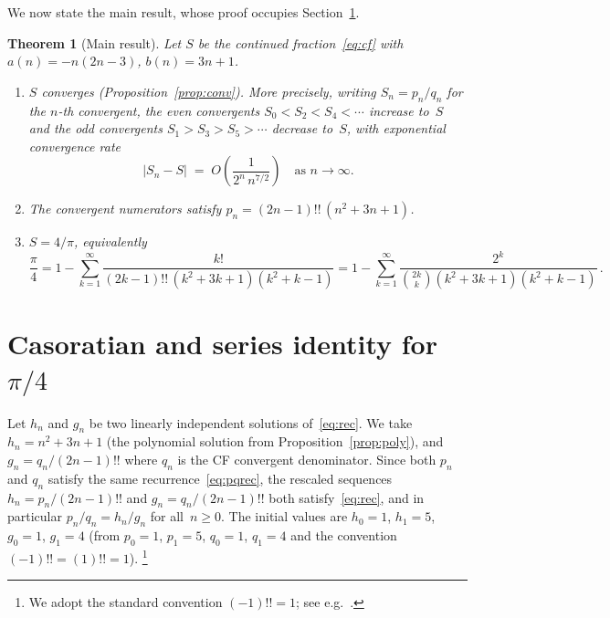 \documentclass[11pt]{article}
\newcommand{\dff}[1]{(#1)!!}
\newtheorem{theorem}{Theorem}[section]
\theoremstyle{remark}
\begin{document}
We now state the main result, whose proof occupies
Section~\ref{sec:casoratian}.

\begin{theorem}[Main result]\label{thm:main}
Let $S$ be the continued fraction~\eqref{eq:cf} with
$a(n)=-n(2n{-}3)$, $b(n)=3n{+}1$.
\begin{enumerate}
\item[\textup{(i)}] $S$ converges
  \textup{(Proposition~\ref{prop:conv})}.
  More precisely, writing $S_n = p_n/q_n$ for the $n$-th convergent,
  the even convergents $S_0 < S_2 < S_4 < \cdots$ increase
  to~$S$ and the odd convergents $S_1 > S_3 > S_5 > \cdots$
  decrease to~$S$, with exponential convergence rate
  \[
    |S_n - S| \;=\; O\!\left(\frac{1}{2^n\,n^{7/2}}\right)
    \quad\text{as }n\to\infty.
  \]
\item[\textup{(ii)}] The convergent numerators satisfy
  $p_n = \dff{2n{-}1}\,(n^2{+}3n{+}1)$.
\item[\textup{(iii)}] $S = 4/\pi$, equivalently
\begin{equation}\label{eq:seriesMain}
  \frac{\pi}{4} = 1 - \sum_{k=1}^{\infty}
    \frac{k!}{\dff{2k{-}1}\,(k^2{+}3k{+}1)(k^2{+}k{-}1)}
  = 1 - \sum_{k=1}^{\infty}
    \frac{2^k}{\binom{2k}{k}(k^2{+}3k{+}1)(k^2{+}k{-}1)}\,.
\end{equation}
\end{enumerate}
\end{theorem}


\section{Casoratian and series identity for $\pi/4$}\label{sec:casoratian}

Let $h_n$ and $g_n$ be two linearly independent solutions
of~\eqref{eq:rec}.  We take $h_n = n^2{+}3n{+}1$ (the polynomial
solution from Proposition~\ref{prop:poly}), and $g_n = q_n/\dff{2n{-}1}$
where $q_n$ is the CF convergent denominator.
Since both $p_n$ and $q_n$ satisfy the same
recurrence~\eqref{eq:pqrec}, the rescaled sequences
$h_n = p_n/\dff{2n{-}1}$ and $g_n = q_n/\dff{2n{-}1}$ both
satisfy~\eqref{eq:rec}, and in particular
$p_n/q_n = h_n/g_n$ for all~$n \geq 0$.
The initial values are $h_0 = 1$, $h_1 = 5$, $g_0 = 1$, $g_1 = 4$
(from $p_0 = 1$, $p_1 = 5$, $q_0 = 1$, $q_1 = 4$ and
the convention $\dff{-1} = \dff{1} = 1$).%
\footnote{We adopt the standard convention $(-1)!! = 1$; see
e.g.\ \cite[\S5.4]{knuth1997art}.}
\end{document}
